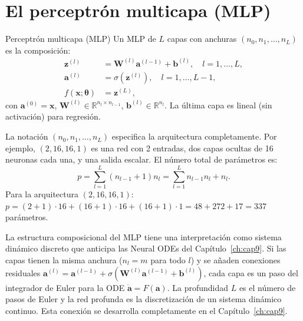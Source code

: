 \section{El perceptrón multicapa (MLP)}
\label{sec:mlp}


\begin{definicion}{Perceptrón multicapa (MLP)}
\label{def:mlp}
Un MLP de $L$ capas con anchuras
$(n_0, n_1, \ldots, n_L)$ es la composición:
\begin{align}
  \bm{z}^{(l)} &= \bm{W}^{(l)}\bm{a}^{(l-1)} + \bm{b}^{(l)},
  \quad l = 1, \ldots, L, \label{eq:preact}\\
  \bm{a}^{(l)} &= \sigma(\bm{z}^{(l)}),
  \quad l = 1, \ldots, L-1, \label{eq:act}\\
  f(\bm{x};\bm{\theta}) &= \bm{z}^{(L)},
  \label{eq:salida}
\end{align}
con $\bm{a}^{(0)} = \bm{x}$, $\bm{W}^{(l)} \in
\mathbb{R}^{n_l \times n_{l-1}}$, $\bm{b}^{(l)} \in \mathbb{R}^{n_l}$.
La última capa es lineal (sin activación) para regresión.
\end{definicion}

La notación $(n_0, n_1, \ldots, n_L)$ especifica la arquitectura
completamente. Por ejemplo, $(2, 16, 16, 1)$ es una red con 2 entradas,
dos capas ocultas de 16 neuronas cada una, y una salida escalar. El
número total de parámetros es:
\begin{equation}
  p = \sum_{l=1}^L (n_{l-1}+1)n_l
  = \sum_{l=1}^L n_{l-1}n_l + n_l.
  \label{eq:conteo}
\end{equation}
Para la arquitectura $(2, 16, 16, 1)$: $p = (2+1)\cdot 16 +
(16+1)\cdot 16 + (16+1)\cdot 1 = 48 + 272 + 17 = 337$ parámetros.

La estructura composicional del MLP tiene una interpretación como
sistema dinámico discreto que anticipa las Neural ODEs del
Capítulo~\ref{ch:cap9}. Si las capas tienen la misma anchura
($n_l = m$ para todo $l$) y se añaden conexiones residuales
$\bm{a}^{(l)} = \bm{a}^{(l-1)} + \sigma(\bm{W}^{(l)}\bm{a}^{(l-1)}
+ \bm{b}^{(l)})$, cada capa es un paso del integrador de Euler para la
ODE $\dot{\bm{a}} = F(\bm{a})$. La profundidad $L$ es el número de
pasos de Euler y la red profunda es la discretización de un sistema
dinámico continuo. Esta conexión se desarrolla completamente en el
Capítulo~\ref{ch:cap9}.

